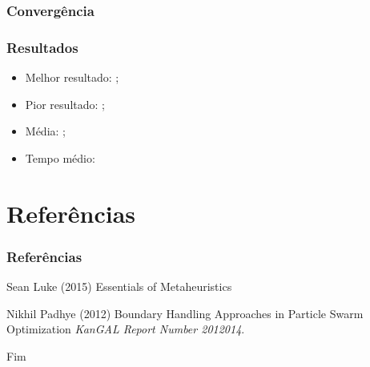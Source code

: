 \documentclass{beamer}
\begin{document}
\begin{frame}
\frametitle{Convergência}
\end{frame}

\begin{frame}
\frametitle{Resultados}
\begin{itemize}
\item Melhor resultado: ;
\item Pior resultado: ;
\item Média: ;
\item Tempo médio: 
\end{itemize}
\end{frame}

\section{Referências}

\begin{frame}
\frametitle{Referências}
\footnotesize{
\begin{thebibliography}{99} %
 Sean Luke (2015)
\newblock Essentials of Metaheuristics

 Nikhil Padhye (2012)
\newblock Boundary Handling Approaches in Particle Swarm Optimization
\newblock \emph{KanGAL Report Number 2012014}.

\end{thebibliography}
}
\end{frame}


\begin{frame}
\Huge{\centerline{Fim}}
\end{frame}

\end{document}
